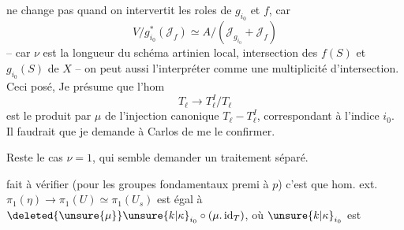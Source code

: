 ne change pas quand on intervertit les roles de $g_{i_0}$ et $f$, car
\[
V/g_{i_0}^*(\mathcal J_f)\simeq A/(\mathcal J_{g_{i_0}}+\mathcal J_f)
\]
-- car $\nu$ est la longueur du schéma artinien local, intersection des  $f(S)$ et $g_{i_0}(S)$ de $X$ -- on peut aussi l'interpréter comme une multiplicité d'intersection. Ceci posé, Je présume que l'hom
\[
T_\ell\longrightarrow T_\ell^I/T_\ell
\]
est le produit par $\mu$ de l'injection canonique $T_\ell-T_\ell^I$, correspondant à l'indice $i_0$. Il faudrait que je demande à Carlos de me le confirmer.

Reste le cas $\nu=1$, qui semble demander un traitement séparé.

 fait à vérifier (pour les groupes fondamentaux premi à $p$) c'est que  hom. ext. $\pi_1(\eta)\longrightarrow\pi_1(U)\simeq\pi_1(U_s)$ est égal à $\deleted{\unsure{\mu}}\unsure{k|\kappa}_{i_0}\circ(\mu.\operatorname{id}_T)$, où $\unsure{k|\kappa}_{i_0}$ est
